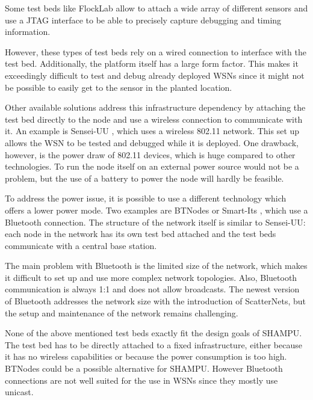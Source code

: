 Some test beds like FlockLab \cite{Lim2013} allow to attach a wide array of different sensors and use a JTAG interface to be able to precisely capture debugging and timing information.

However, these types of test beds rely on a wired connection to interface with the test bed. Additionally, the platform itself has a large form factor. This makes it exceedingly difficult to test and debug already deployed WSNs since it might not be possible to easily get to the sensor in the planted location.

Other available solutions address this infrastructure dependency by attaching the test bed directly to the node and use a wireless connection to communicate with it. An example is Sensei-UU \cite{Rensfelt2009}, which uses a wireless 802.11 network. This set up allows the WSN to be tested and debugged while it is deployed. One drawback, however, is the power draw of 802.11 devices, which is huge compared to other technologies. To run the node itself on an external power source would not be a problem, but the use of a battery to power the node will hardly be feasible.

To address the power issue, it is possible to use a different technology which offers a lower power mode. Two examples are BTNodes \cite{Moser} or Smart-Its \cite{Kasten2000}, which use a Bluetooth connection. 
The structure of the network itself is similar to Sensei-UU: each node in the network has its own test bed attached and the test beds communicate with a central base station.

The main problem with Bluetooth is the limited size of the network, which makes it difficult to set up and use more complex network topologies. Also, Bluetooth communication is always 1:1 and does not allow broadcasts. The newest version of Bluetooth addresses the network size with the introduction of ScatterNets, but the setup and maintenance of the network remains challenging.

None of the above mentioned test beds exactly fit the design goals of SHAMPU. The test bed has to be directly attached to a fixed infrastructure, either because it has no wireless capabilities or because the power consumption is too high. BTNodes could be a possible alternative for SHAMPU. However Bluetooth connections are not well suited for the use in WSNs since they mostly use unicast.
